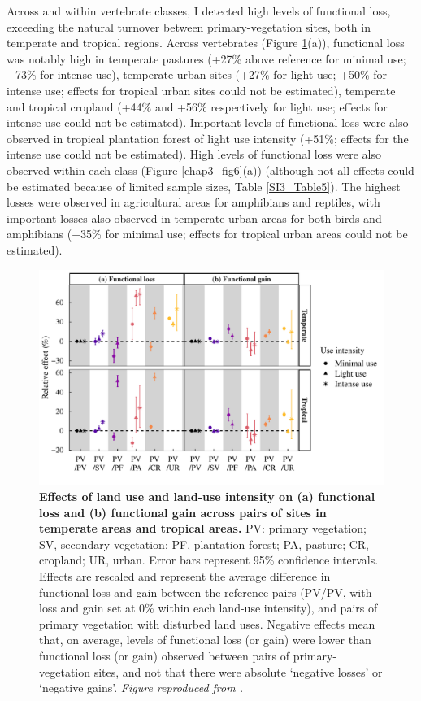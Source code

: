 Across and within vertebrate classes, I detected high levels of functional loss, exceeding the natural turnover between primary-vegetation sites, both in temperate and tropical regions. Across vertebrates (Figure \ref{chap3_fig5}(a)), functional loss was notably high in temperate pastures (+27\% above reference for minimal use; +73\% for intense use), temperate urban sites (+27\% for light use; +50\% for intense use; effects for tropical urban sites could not be estimated), temperate and tropical cropland (+44\% and +56\% respectively for light use; effects for intense use could not be estimated). Important levels of functional loss were also observed in tropical plantation forest of light use intensity (+51\%; effects for the intense use could not be estimated). High levels of functional loss were also observed within each class (Figure \ref{chap3_fig6}(a)) (although not all effects could be estimated because of limited sample sizes, Table \ref{SI3_Table5}). The highest losses were observed in agricultural areas for amphibians and reptiles, with important losses also observed in temperate urban areas for both birds and amphibians (+35\% for minimal use; effects for tropical urban areas could not be estimated).

\begin{figure}[h!]
\centering
\includegraphics[scale=0.75]{figures/Chapter_FD/Figure5}
\caption[Effects of land use and land-use intensity on (a) functional loss and (b) functional gain across pairs of sites in temperate areas and tropical areas.]{\textbf{Effects of land use and land-use intensity on (a) functional loss and (b) functional gain across pairs of sites in temperate areas and tropical areas.} PV: primary vegetation; SV, secondary vegetation; PF, plantation forest; PA, pasture; CR, cropland; UR, urban. Error bars represent 95\% confidence intervals. Effects are rescaled and represent the average difference in functional loss and gain between the reference pairs (PV/PV, with loss and gain set at 0\% within each land-use intensity), and pairs of primary vegetation with disturbed land uses. Negative effects mean that, on average, levels of functional loss (or gain) were lower than functional loss (or gain) observed between pairs of primary-vegetation sites, and not that there were absolute `negative losses' or `negative gains'. \textit{Figure reproduced from \citet{Etard2021}.}}
\label{chap3_fig5}
\end{figure}


